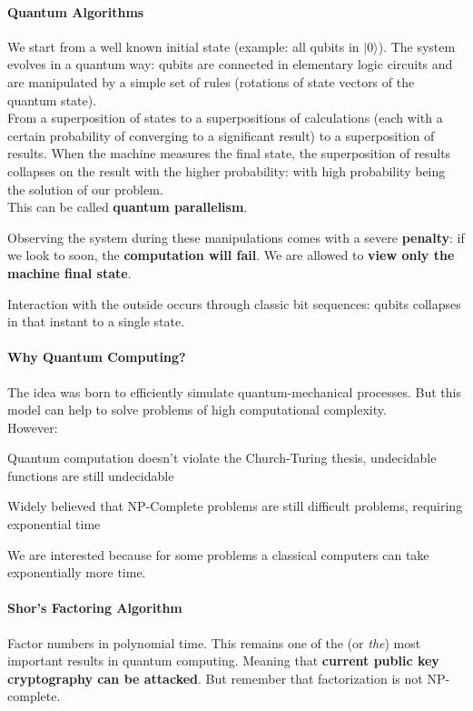 \documentclass[10pt]{report}
\begin{document}
\paragraph{Quantum Algorithms} We start from a well known initial state (example: all qubits in $|0\rangle$). The system evolves in a quantum way: qubits are connected in elementary logic circuits and are manipulated by a simple set of rules (rotations of state vectors of the quantum state).\\
From a superposition of states to a superpositions of calculations (each with a certain probability of converging to a significant result) to a superposition of results. When the machine measures the final state, the superposition of results collapses on the result with the higher probability: with high probability being the solution of our problem.\\
This can be called \textbf{quantum parallelism}.\begin{list}{}{}
	\item Observing the system during these manipulations comes with a severe \textbf{penalty}: if we look to soon, the \textbf{computation will fail}. We are allowed to \textbf{view only the machine final state}.
	\item Interaction with the outside occurs through classic bit sequences: qubits collapses in that instant to a single state.
\end{list}
\paragraph{Why Quantum Computing?} The idea was born to efficiently simulate quantum-mechanical processes. But this model can help to solve problems of high computational complexity.\\
However:
\begin{list}{}{}
	\item Quantum computation doesn't violate the Church-Turing thesis, undecidable functions are still undecidable
	\item Widely believed that NP-Complete problems are still difficult problems, requiring exponential time
\end{list}
We are interested because for some problems a classical computers can take exponentially more time.
\paragraph{Shor's Factoring Algorithm} Factor numbers in polynomial time. This remains one of the (or \textit{the}) most important results in quantum computing. Meaning that \textbf{current public key cryptography can be attacked}. But remember that factorization is not NP-complete.
\end{document}
